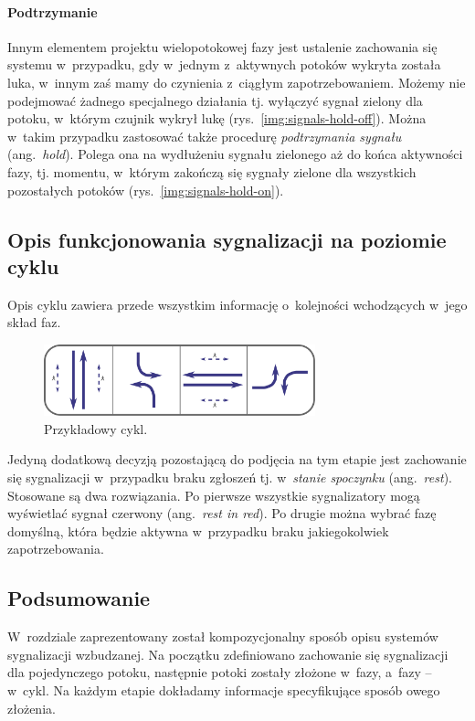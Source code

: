 \documentclass{pracamgr}
\newcommand{\ang}[1]{(ang.~\emph{#1})}
\newcommand{\imgr}[1]{rys.~\ref{#1}}
\theoremstyle{plain}
\begin{document}
\paragraph{Podtrzymanie} Innym elementem projektu wielopotokowej fazy
jest ustalenie zachowania się systemu w~przypadku, gdy w~jednym
z~aktywnych potoków wykryta została luka, w~innym zaś mamy do
czynienia z~ciągłym zapotrzebowaniem. Możemy nie podejmować żadnego
specjalnego działania tj. wyłączyć sygnał zielony dla potoku, w~którym
czujnik wykrył lukę (\imgr{img:signals-hold-off}). Można w~takim
przypadku zastosować także procedurę \emph{podtrzymania sygnału}
\ang{hold}. Polega ona na wydłużeniu sygnału zielonego aż do końca
aktywności fazy, tj. momentu, w~którym zakończą się sygnały zielone
dla wszystkich pozostałych potoków (\imgr{img:signals-hold-on}).

\subsection{Opis funkcjonowania sygnalizacji na poziomie cyklu}
Opis cyklu zawiera przede wszystkim informację o~kolejności
wchodzących w~jego skład faz.
\begin{figure} \centering
  \includegraphics[width=0.7\textwidth]{img/signals-cycle-example}
  \caption{Przykładowy cykl.}
\end{figure}
Jedyną dodatkową decyzją pozostającą do podjęcia na tym etapie jest
zachowanie się sygnalizacji w~przypadku braku zgłoszeń tj.
w~\emph{stanie spoczynku} \ang{rest}. Stosowane są dwa rozwiązania. Po
pierwsze wszystkie sygnalizatory mogą wyświetlać sygnał czerwony
\ang{rest in red}. Po drugie można wybrać fazę domyślną, która będzie
aktywna w~przypadku braku jakiegokolwiek zapotrzebowania.

\subsection{Podsumowanie}
\label{ss:signals:actuated:summary}
W~rozdziale zaprezentowany został kompozycjonalny sposób opisu
systemów sygnalizacji wzbudzanej. Na początku zdefiniowano zachowanie
się sygnalizacji dla pojedynczego potoku, następnie potoki zostały
złożone w~fazy, a~fazy -- w~cykl. Na każdym etapie dokładamy
informacje specyfikujące sposób owego złożenia.
\end{document}
